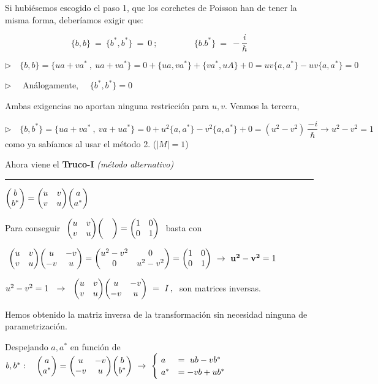 Si hubiésemos escogido el paso 1, que los corchetes de Poisson han de tener la misma forma, deberíamos exigir que:

$$\{b,b\}\ = \ \{b^*,b^*\}\ = \ 0\ ;\ \qquad \qquad \{b.b^*\}\ =\ -\dfrac i \hbar$$


$\triangleright \quad \{b,b\} = \{ua+va^*\ , \ ua+va^*\}=0+\{ua,va^*\}+\{va^*,uA\}+0=uv\{a,a^*\}-uv\{a,a^*\}=0$


$\triangleright \quad $ Análogamente, $\quad \{b^*,b^*\} =0$ 

Ambas exigencias no aportan ninguna restricción para $u,v$. Veamos la tercera,

$\triangleright \quad \{b,b^*\} =\{ua+va^*\ , \ va+ua^*\}=0+u^2\{a,a^*\}-v^2\{a,a^*\}+0=(u^2-v^2)\ \dfrac{-i}{\hbar} \to u^2-v^2=1$ como ya sabíamos al usar el método 2. ($|M|=1$)

\vspace{5mm}
Ahora viene el \textbf{Truco-I} \emph{(método alternativo)} $\quad$ \rule{200pt}{0.1pt}

$\mqty(b \\ b^*)=\mqty(u&v\\v&u)\mqty(a\\a^*)$

Para conseguir  $\ \mqty(u&v\\v&u) \mqty(&\\&) = \mqty(1&0\\0&1)\ $ basta con 

$\ \mqty(u&v\\v&u) \mqty(u&-v\\-v&u) =\mqty(u^2-v^2&0\\0&u^2-v^2) =\mqty(1&0\\0&1)\ \to \ \bold{u^2-v^2}=1$

$u^2-v^2=1 \ \ \to \ \  \mqty(u&v\\v&u) \mqty(u&-v\\-v&u) \ = \ I\, , \ $ son matrices inversas.

Hemos obtenido la matriz inversa de la transformación sin necesidad ninguna de parametrización.

Despejando $a,a^*$ en función de $b,b^*:\ \ \ \mqty(a \\ a^*)=\mqty(u&-v\\-v&u)\mqty(b\\b^*) \ \to \ \begin{cases} \ a&=\ ub-vb^*\\ \ a^*&=-vb+ub^* \end{cases}$

